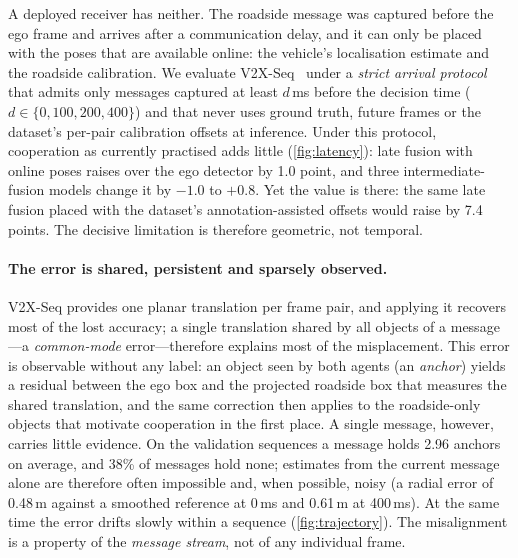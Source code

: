 A deployed receiver has neither.
The roadside message was captured before the ego frame and arrives after a communication delay, and it can only be placed with the poses that are available online: the vehicle's localisation estimate and the roadside calibration.
We evaluate V2X-Seq~\cite{yu2023v2xseq} under a \emph{strict arrival protocol} that admits only messages captured at least $d$\,ms before the decision time ($d\in\{0,100,200,400\}$) and that never uses ground truth, future frames or the dataset's per-pair calibration offsets at inference.
Under this protocol, cooperation as currently practised adds little (\cref{fig:latency}): late fusion with online poses raises \apseven over the ego detector by 1.0 point, and three intermediate-fusion models change it by $-1.0$ to $+0.8$.
Yet the value is there: the same late fusion placed with the dataset's annotation-assisted offsets would raise \apseven by 7.4 points.
The decisive limitation is therefore geometric, not temporal.

\paragraph{The error is shared, persistent and sparsely observed.}
V2X-Seq provides one planar translation per frame pair, and applying it recovers most of the lost accuracy; a single translation shared by all objects of a message---a \emph{common-mode} error---therefore explains most of the misplacement.
This error is observable without any label: an object seen by both agents (an \emph{anchor}) yields a residual between the ego box and the projected roadside box that measures the shared translation, and the same correction then applies to the roadside-only objects that motivate cooperation in the first place.
A single message, however, carries little evidence.
On the validation sequences a message holds 2.96 anchors on average, and 38\% of messages hold none; estimates from the current message alone are therefore often impossible and, when possible, noisy (a radial error of 0.48\,m against a smoothed reference at 0\,ms and 0.61\,m at 400\,ms).
At the same time the error drifts slowly within a sequence (\cref{fig:trajectory}).
The misalignment is a property of the \emph{message stream}, not of any individual frame.

